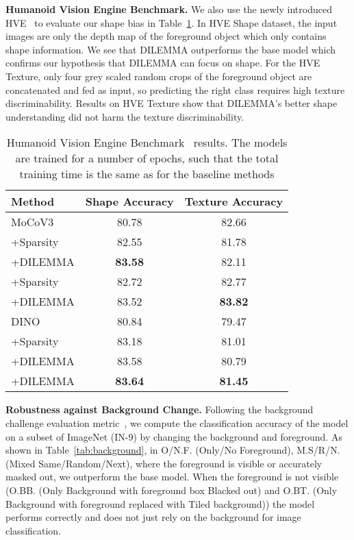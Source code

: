 \documentclass[letterpaper]{article} \usepackage{aaai23}  \usepackage{times}  \usepackage{helvet}  \usepackage{courier}  \usepackage[hyphens]{url}  \usepackage{graphicx} \urlstyle{rm} \def\UrlFont{\rm}  \usepackage{natbib}  \usepackage{caption} \frenchspacing  \setlength{\pdfpagewidth}{8.5in}  \setlength{\pdfpageheight}{11in}  \usepackage{algorithm}
\newcommand{\methodname}{DILEMMA}
\begin{document}
\noindent\textbf{Humanoid Vision Engine Benchmark.} We also use the newly introduced HVE~\cite{ge2022contributions} to evaluate our shape bias in Table~\ref{tab:hve}. In HVE Shape dataset, the input images are only the depth map of the foreground object which only contains shape information. We see that {\methodname} outperforms the base model which confirms our hypothesis that {\methodname} can focus on shape. For the HVE Texture, only four grey scaled random crops of the foreground object are concatenated and fed as input, so predicting the right class requires high texture discriminability. Results on HVE Texture show that {\methodname}'s better shape understanding did not harm the texture discriminability. \\
\begin{table}[t]
    \centering
        \begin{tabular}{lcc}
    \toprule
    Method & Shape Accuracy & Texture Accuracy\\
    \midrule
MoCoV3 & 80.78 & 82.66\\
+Sparsity & 82.55 & 81.78\\
+\methodname & \bf 83.58 & 82.11\\
+Sparsity & 82.72 & 82.77\\
+\methodname & 83.52 & \bf 83.82\\
\midrule
DINO & 80.84 & 79.47\\
+Sparsity & 83.18 & 81.01\\
+\methodname & 83.58 & 80.79\\
+\methodname & \bf 83.64 & \bf 81.45\\
    \bottomrule
    \end{tabular}
    \caption{Humanoid Vision Engine Benchmark~\cite{ge2022contributions} results. The  models are trained for a number of epochs, such that the total training time is the same as for the baseline methods}
    \label{tab:hve}
\end{table}

\noindent\textbf{Robustness against Background Change.} Following the background challenge evaluation metric~\cite{xiao2020noise}, we compute the classification accuracy of the model on a subset of ImageNet (IN-9) by changing the background and foreground. As shown in Table~\ref{tab:background}, in O/N.F. (Only/No Foreground), M.S/R/N. (Mixed Same/Random/Next), where the foreground is visible or accurately masked out, we outperform the base model. When the foreground is not visible (O.BB. (Only Background with foreground box Blacked out) and O.BT. (Only Background with foreground replaced with Tiled background)) the model performs correctly and does not just rely on the background for image classification.
\end{document}
